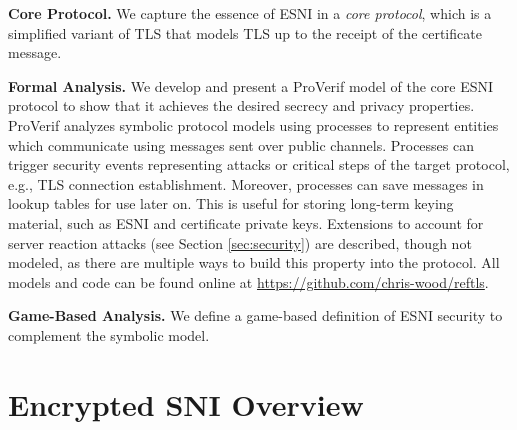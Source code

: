 \documentclass{article}
\theoremstyle{definition}
\theoremstyle{definition}
\begin{document}
\textbf{Core Protocol.} We capture the essence of ESNI in a \emph{core protocol}, which is a simplified variant
of TLS that models TLS up to the receipt of the certificate message.

\textbf{Formal Analysis.} We develop and present a ProVerif model of the core ESNI protocol to show that it
achieves the desired secrecy and privacy properties.  ProVerif analyzes symbolic protocol models using 
processes to represent entities which communicate using messages sent over public channels. Processes
can trigger security events representing attacks or critical steps of the target protocol, e.g., TLS connection establishment.
Moreover, processes can save messages in lookup tables for use later on. This is useful for storing long-term keying
material, such as ESNI and certificate private keys. Extensions to account for server reaction attacks 
(see Section \ref{sec:security}) are described, though not modeled, as there are multiple ways to build 
this property into the protocol. All models and code can be found online at \url{https://github.com/chris-wood/reftls}.

\textbf{Game-Based Analysis.} We define a game-based definition of ESNI security to complement the symbolic model.

\section{Encrypted SNI Overview}

\end{document}
